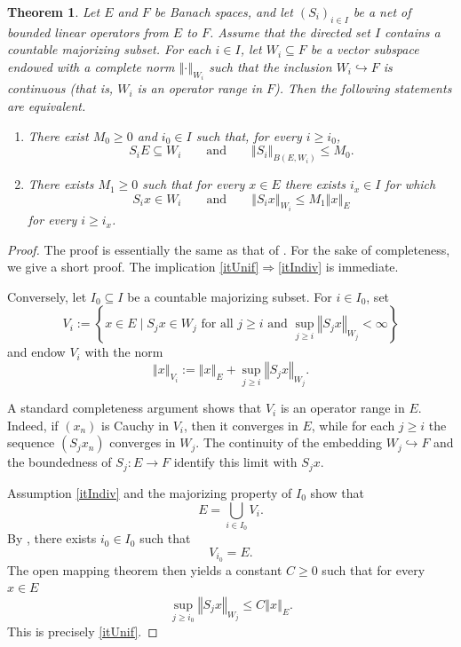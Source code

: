 \documentclass[12pt]{amsart}
\theoremstyle{plain}
\newtheorem{thm}{Theorem}[section]
\theoremstyle{definition}
\newcommand{\norm}[1]{\left\Vert #1\right\Vert}
\begin{document}
	\begin{thm}
		\label{thmRange}
		Let $E$ and $F$ be Banach spaces, and let $(S_i)_{i\in I}$ be a net of bounded linear operators from $E$ to $F$. Assume that the directed set $I$ contains a countable majorizing subset. For each $i\in I$, let $W_i\subseteq F$ be a vector subspace endowed with a complete norm $\norm{\cdot}_{W_i}$ such that the inclusion $W_i\hookrightarrow F$ is continuous (that is, $W_i$ is an operator range in $F$). Then the following statements are equivalent.
		\begin{enumerate}[label=\upshape(\alph*)]
			\item\label{itUnif}
			There exist $M_0\ge 0$ and $i_0\in I$ such that, for every $i\ge i_0$,
			\[
			S_i E \subseteq W_i
			\qquad\text{and}\qquad
			\norm{S_i}_{B(E, W_i)} \le M_0.
			\]
			
			\item\label{itIndiv}
			There exists $M_1\ge 0$ such that for every $x\in E$ there exists $i_x\in I$ for which
			\[
			S_i x \in W_i
			\qquad\text{and}\qquad
			\norm{S_i x}_{W_i} \le M_1\norm{x}_E
			\]
			for every $i\ge i_x$.
		\end{enumerate}
	\end{thm}
	
	\begin{proof}
		The proof is essentially the same as that of \cite[Theorem 2.6]{AroraGlueck2024}. For the sake of completeness, we give a short proof. The implication \ref{itUnif}$\Rightarrow$\ref{itIndiv} is immediate.
		
		Conversely, let $I_0\subseteq I$ be a countable majorizing subset. For $i\in I_0$, set
		\[
		V_i := \left\{ x\in E \mid S_j x\in W_j \text{ for all } j\ge i \text{ and } \sup_{j\ge i}\norm{S_j x}_{W_j}<\infty \right\}
		\]
		and endow $V_i$ with the norm
		\[
		\norm{x}_{V_i} := \norm{x}_E + \sup_{j\ge i}\norm{S_j x}_{W_j}.
		\]
		
		A standard completeness argument shows that $V_i$ is an operator range in $E$. Indeed, if $(x_n)$ is Cauchy in $V_i$, then it converges in $E$, while for each $j\ge i$ the sequence $(S_j x_n)$ converges in $W_j$. The continuity of the embedding $W_j\hookrightarrow F$ and the boundedness of $S_j\colon E\to F$ identify this limit with $S_j x$.
		
		Assumption \ref{itIndiv} and the majorizing property of $I_0$ show that
		\[
		E = \bigcup_{i\in I_0} V_i.
		\]
		By \cite[Proposition 2.6]{AroraGlueck2023}, there exists $i_0\in I_0$ such that 
		\[
		V_{i_0} = E.
		\]
		The open mapping theorem then yields a constant $C\ge 0$ such that for every $x\in E$
		\[
		\sup_{j\ge i_0}\norm{S_j x}_{W_j} \le C\norm{x}_E.
		\]
		This is precisely \ref{itUnif}.
	\end{proof}
	
\end{document}
